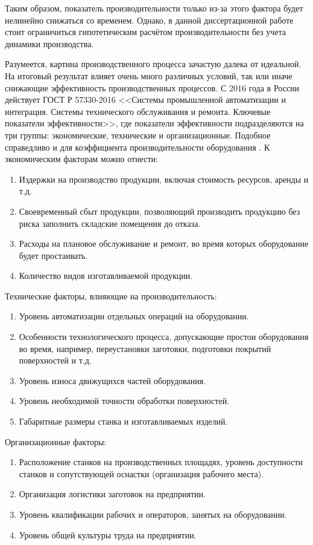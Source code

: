 Таким образом, показатель производительности только из-за этого фактора будет нелинейно снижаться со временем. Однако, в данной диссертационной работе стоит ограничиться гипотетическим расчётом производительности без учета динамики производства.

Разумеется, картина производственного процесса зачастую далека от идеальной. На итоговый результат влияет очень много различных условий, так или иначе снижающие эффективность производственных процессов. С 2016 года в России действует ГОСТ Р 57330-2016 <<Системы промышленной автоматизации и интеграция. Системы технического обслуживания и ремонта. Ключевые показатели эффективности>>, где показатели эффективности подразделяются на три группы: экономические, технические и организационные. Подобное справедливо и для коэффициента производительности оборудования \cite{effectivnost}. К экономическим факторам можно отнести:

\begin{enumerate}
	\item Издержки на производство продукции, включая стоимость ресурсов, аренды и т.д.
	\item Своевременный сбыт продукции, позволяющий производить продукцию без риска заполнить складские помещения до отказа.
	\item Расходы на плановое обслуживание и ремонт, во время которых оборудование будет простаивать.
	\item Количество видов изготавливаемой продукции.
\end{enumerate}

Технические факторы, влияющие на производительность:

\begin{enumerate}
	\item Уровень автоматизации отдельных операций на оборудовании.
	\item Особенности технологического процесса, допускающие простои оборудования во время, например, переустановки заготовки, подготовки покрытий поверхностей и т.д.
	\item Уровень износа движущихся частей оборудования.
	\item Уровень необходимой точности обработки поверхностей.
	\item Габаритные размеры станка и изготавливаемых изделий.
\end{enumerate}

Организационные факторы:

\begin{enumerate}
	\item Расположение станков на производственных площадях, уровень доступности станков и сопутствующей оснастки (организация рабочего места).
	\item Организация логистики заготовок на предприятии.
	\item Уровень квалификации рабочих и операторов, занятых на оборудовании.
	\item Уровень общей культуры труда на предприятии.
\end{enumerate}


